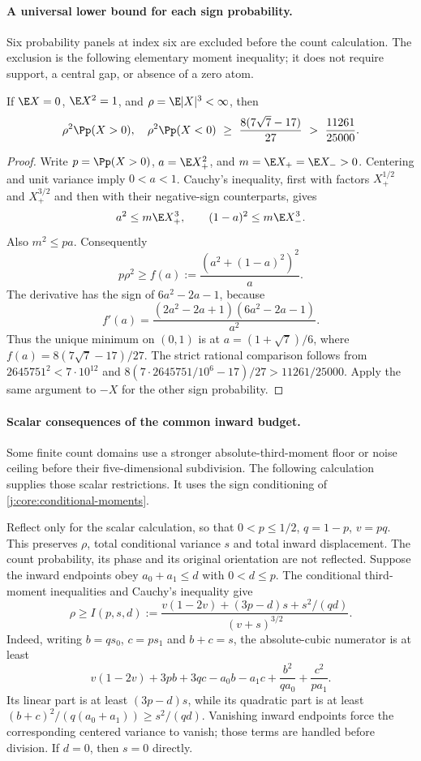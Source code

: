 \paragraph{A universal lower bound for each sign probability.}
\label{j:local:ext:sign-mass}
Six probability panels at index six are excluded before the count
calculation. The exclusion is the following elementary moment inequality;
it does not require support, a central gap, or absence of a zero atom.

\begin{lemma}\label{j:local:sign-mass}
If $\E X=0$, $\E X^2=1$, and $\rho=\E|X|^3<\infty$, then
\[
 \rho^2\Pp(X>0),\quad \rho^2\Pp(X<0)
 \ \ge\ \frac{8(7\sqrt7-17)}{27}
 \ >\ \frac{11261}{25000}.
\]
\end{lemma}
\begin{proof}
Write $p=\Pp(X>0)$, $a=\E X_+^2$, and
$m=\E X_+=\E X_->0$. Centering and unit variance imply
$0<a<1$. Cauchy's inequality, first with factors
$X_+^{1/2}$ and $X_+^{3/2}$ and then with their negative-sign
counterparts, gives
\[
 a^2\le m\E X_+^3,\qquad (1-a)^2\le m\E X_-^3.
\]
Also $m^2\le pa$. Consequently
\[
 p\rho^2\ge f(a):=\frac{(a^2+(1-a)^2)^2}{a}.
\]
The derivative has the sign of $6a^2-2a-1$, because
\[
 f'(a)=\frac{(2a^2-2a+1)(6a^2-2a-1)}{a^2}.
\]
Thus the unique minimum on $(0,1)$ is at
$a=(1+\sqrt7)/6$, where
$f(a)=8(7\sqrt7-17)/27$. The strict rational comparison follows
from $2645751^2<7\cdot10^{12}$ and
$8(7\cdot2645751/10^6-17)/27>11261/25000$.
Apply the same argument to $-X$ for the other sign probability.
\end{proof}



\paragraph{Scalar consequences of the common inward budget.}
\label{j:local:ext:inward-scalar}
Some finite count domains use a stronger absolute-third-moment floor or
noise ceiling before their five-dimensional subdivision. The following
calculation supplies those scalar restrictions. It uses the sign
conditioning of \eqref{j:core:conditional-moments}.

Reflect only for the scalar calculation, so that
$0<p\le1/2$, $q=1-p$, $v=pq$. This preserves $\rho$, total
conditional variance $s$ and total inward displacement. The count
probability, its phase and its original orientation are not reflected.
Suppose the inward endpoints obey $a_0+a_1\le d$ with $0<d\le p$.
The conditional third-moment inequalities and Cauchy's inequality give
\begin{equation}\label{j:local:ext:inward-I}
 \rho\ge I(p,s,d):=
 \frac{v(1-2v)+(3p-d)s+s^2/(qd)}{(v+s)^{3/2}}.
\end{equation}
Indeed, writing $b=qs_0$, $c=ps_1$ and $b+c=s$, the absolute-cubic
numerator is at least
\[
 v(1-2v)+3pb+3qc-a_0b-a_1c
                       +\frac{b^2}{qa_0}+\frac{c^2}{pa_1}.
\]
Its linear part is at least $(3p-d)s$, while its quadratic part is
at least $(b+c)^2/(q(a_0+a_1))\ge s^2/(qd)$.
Vanishing inward endpoints force the corresponding centered variance
to vanish; those terms are handled before division. If $d=0$, then
$s=0$ directly.


